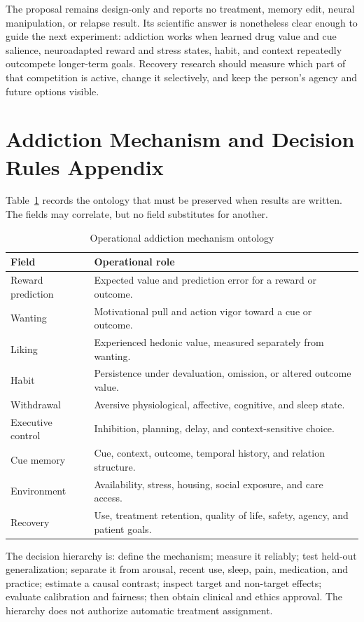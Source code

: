 \documentclass[conference]{IEEEtran}
\begin{document}
The proposal remains design-only and reports no treatment, memory edit, neural manipulation, or relapse result. Its scientific answer is nonetheless clear enough to guide the next experiment: addiction works when learned drug value and cue salience, neuroadapted reward and stress states, habit, and context repeatedly outcompete longer-term goals. Recovery research should measure which part of that competition is active, change it selectively, and keep the person's agency and future options visible.

\appendices
\section{Addiction Mechanism and Decision Rules Appendix}
Table~\ref{tab:ontology} records the ontology that must be preserved when results are written. The fields may correlate, but no field substitutes for another.

\begin{table}[h]
\caption{Operational addiction mechanism ontology}
\label{tab:ontology}
\centering
\footnotesize
\setlength{\tabcolsep}{2pt}
\begin{tabular}{p{}p{}}
\toprule
Field & Operational role \\
\midrule
Reward prediction & Expected value and prediction error for a reward or outcome. \\
Wanting & Motivational pull and action vigor toward a cue or outcome. \\
Liking & Experienced hedonic value, measured separately from wanting. \\
Habit & Persistence under devaluation, omission, or altered outcome value. \\
Withdrawal & Aversive physiological, affective, cognitive, and sleep state. \\
Executive control & Inhibition, planning, delay, and context-sensitive choice. \\
Cue memory & Cue, context, outcome, temporal history, and relation structure. \\
Environment & Availability, stress, housing, social exposure, and care access. \\
Recovery & Use, treatment retention, quality of life, safety, agency, and patient goals. \\
\bottomrule
\end{tabular}
\end{table}

The decision hierarchy is: define the mechanism; measure it reliably; test held-out generalization; separate it from arousal, recent use, sleep, pain, medication, and practice; estimate a causal contrast; inspect target and non-target effects; evaluate calibration and fairness; then obtain clinical and ethics approval. The hierarchy does not authorize automatic treatment assignment.
\end{document}
